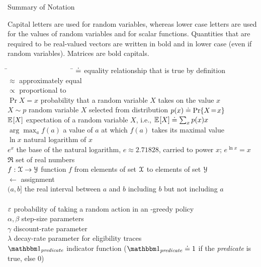 \documentclass[10pt,fleqn]{article}
\begin{document}
\centerline{\Large Summary of Notation}

\bigskip\noindent
Capital letters are used for random variables, whereas lower case letters are used for the values of random variables and for scalar functions. Quantities that are required to be real-valued vectors are written in bold and in lower case (even if random variables). Matrices are bold capitals.
\begin{tabbing}
\=~~~~~~~~~~~~~~~~~~  \= \kill
\>$\doteq$            \> equality relationship that is true by definition\\
\>$\approx$           \> approximately equal\\
\>$\propto$           \> proportional to\\
\>$\Pr{X\!=\!x}$      \> probability that a random variable $X$ takes on the value $x$\\
\>$X\sim p$           \> random variable $X$ selected from distribution $p(x)\doteq{{\rm Pr\!}\left\{X\!=\!x\right\}}$\\
\>$\mathbb{E}_{\,\!\!}\left[X\right]$             \> expectation of a random variable $X$, i.e., $\mathbb{E}_{\,\!\!}\left[X\right]\doteq\sum_x p(x)x$\\
\>$\arg\max_a f(a)$   \> a value of $a$ at which $f(a)$ takes its maximal value\\
\>$\ln x$             \> natural logarithm of $x$\\
\>$e^x$               \> the base of the natural logarithm, $e\approx 2.71828$, carried to power $x$; $e^{\ln x}=x$\\
\>$\Re$               \> set of real numbers\\
\>$f:{\cal X}\rightarrow{\cal Y}$ \> function $f$ from elements of set ${\cal X}$ to elements of set ${\cal Y}$\\
\>$\leftarrow$        \> assignment\\
\>$(a,b]$             \> the real interval between $a$ and $b$ including $b$ but not including $a$\\
\\
\>$\mbox{$\varepsilon$}$                \> probability of taking a random action in an \e-greedy policy\\
\>$\alpha, \beta$     \> step-size parameters\\
\>$\gamma$            \> discount-rate parameter\\
\>$\lambda$           \> decay-rate parameter for eligibility traces\\
\>$\ind{\text{\emph{predicate}}}$ \>indicator function ($\ind{\text{\emph{predicate}}}\defeq1$ if the \emph{predicate} is true, else 0)\\

\end{tabbing}
\end{document}
